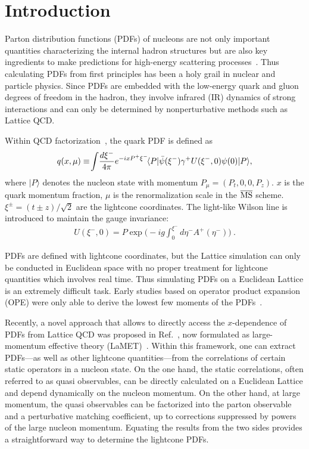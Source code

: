 \section{Introduction}
Parton distribution functions (PDFs) of nucleons are not only  important quantities characterizing   the internal hadron  structures but  are also key ingredients to make   predictions for high-energy scattering processes~\cite{Butterworth:2015oua,Alekhin:2017kpj,Gao:2017yyd}. Thus calculating PDFs from first principles has been a holy grail in nuclear and particle physics. Since PDFs are embedded with the low-energy quark and gluon degrees of freedom in the hadron, they involve infrared (IR) dynamics of strong interactions  and can only be determined by nonperturbative methods such as Lattice QCD.

Within QCD factorization~\cite{Collins:2011zzd}, the quark PDF is defined  as
\begin{align} \label{eq:lcpdf}
q(x,\mu) \equiv\! \int\! {d\xi^-\over 4\pi} e^{-ixP^+\xi^-}\! \langle P | \bar{\psi}  (\xi^-) \gamma^+ U (\xi^-, 0) \psi (0) | P \rangle ,
\end{align}
where $|P\rangle$ denotes the nucleon state with momentum $P_\mu=(P_t,0,0,P_z)$. $x$ is the quark momentum fraction, $\mu$ is the renormalization scale in the $\overline{\rm MS}$ scheme.  $\xi^{\pm}=(t\pm z)/\sqrt{2}$ are  the lightcone coordinates. The light-like Wilson line is introduced to maintain the gauge invariance:
\begin{align}
U(\xi^-,0) = P\exp\biggl(-ig\int_0^{\xi^-} d\eta^- A^+(\eta^-)\biggr)\ .
\end{align}

PDFs are defined with  lightcone coordinates, but  the Lattice simulation can only be conducted in  Euclidean space with no proper treatment for lightcone quantities which involves real time. Thus
simulating PDFs on a Euclidean Lattice is an extremely difficult task.
Early studies based on operator product expansion (OPE) were only able to derive the lowest few moments of the PDFs~\cite{Martinelli:1987zd,Martinelli:1988xs,Detmold:2001dv,Dolgov:2002zm}.

Recently, a novel approach  that allows  to directly access the $x$-dependence of PDFs  from Lattice QCD was proposed in Ref.~\cite{Ji:2013dva}, now formulated as large-momentum effective theory (LaMET)~\cite{Ji:2014gla}. Within this framework, one can  extract PDFs---as well as other lightcone quantities---from the correlations of certain static operators in a  nucleon state. On the one hand,  the  static correlations, often referred to as quasi observables, can be directly calculated on a Euclidean Lattice and depend dynamically on the nucleon momentum. On the other hand, at large momentum,  the quasi observables can be factorized into the parton observable and a perturbative matching coefficient, up to corrections suppressed by    powers of the large nucleon momentum. Equating the results from the two sides provides a straightforward way to determine the lightcone PDFs.

